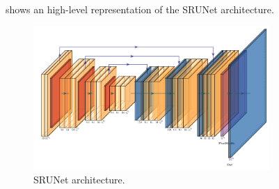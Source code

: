 




 shows an high-level representation of the SRUNet architecture.

\begin{figure}[h]
\centering
\includegraphics[width=0.8\textwidth]{static/srunet_architecture.png}
\caption{SRUNet architecture.}
\label{fig:srunet}
\end{figure}

